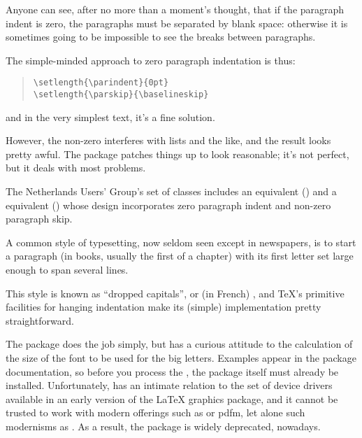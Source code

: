 Anyone can see, after no more than a moment's thought, that if the
paragraph indent is zero, the paragraphs must be separated by blank
space: otherwise it is sometimes going to be impossible to see the
breaks between paragraphs.

The simple-minded approach to zero paragraph indentation is thus:
\begin{quote}
\begin{verbatim}
\setlength{\parindent}{0pt}
\setlength{\parskip}{\baselineskip}
\end{verbatim}
\end{quote}
and in the very simplest text, it's a fine solution.

However, the non-zero  interferes with lists and the like,
and the result looks pretty awful.  The  package
patches things up to look reasonable; it's not perfect, but it deals
with most problems.

The Netherlands Users' Group's set of classes includes an
 equivalent () and a 
equivalent () whose design incorporates zero paragraph
indent and non-zero paragraph skip.
\begin{ctanrefs}
\item[\nothtml{\rmfamily}\acro{NTG} classes]
\item[parskip.sty]
\end{ctanrefs}


A common style of typesetting, now seldom seen except in newspapers,
is to start a paragraph (in books, usually the first of a chapter)
with its first letter set large enough to span several lines.

This style is known as ``dropped capitals'', or (in French)
,
and \TeX{}'s primitive facilities for hanging indentation make its
(simple) implementation pretty straightforward.

The  package does the job simply, but has a curious
attitude to the calculation of the size of the font to be used for the
big letters.  Examples appear in the package documentation, so before
you process the , the package itself must already be
installed.  Unfortunately,  has an intimate relation
to the set of device drivers available in an early version of the
\LaTeX{} graphics package, and it cannot be trusted to work with
modern offerings such as \PDFTeX{} or pdfm, let
alone such modernisms as \xetex{}.  As a result, the package is widely
deprecated, nowadays.

